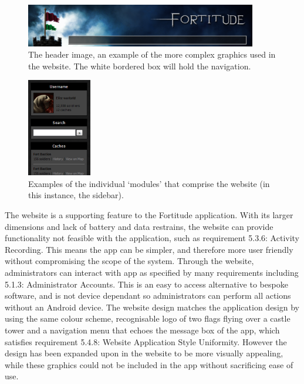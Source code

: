 \begin{figure}[ht]
	\vspace{-20pt}
	\begin{center}
	\includegraphics[width=0.9\textwidth]{images/website_header_background}
	\caption{The header image, an example of the more complex graphics used in the website. The white bordered box will hold the navigation.}
	\label{website_header_background}
	\end{center}
	\vspace{-20pt}
\end{figure}

\newpage
\begin{figure}
	\vspace{-15pt}
	\begin{center}
	\includegraphics[width=0.25\textwidth]{images/sidebar_modules}
	\caption{Examples of the individual `modules' that comprise the website (in this instance, the sidebar).}
	\label{sidebar_modules}
	\end{center}
	\vspace{20pt}
\end{figure}

The website is a supporting feature to the Fortitude application. With its larger dimensions and lack of battery and data restrains, the website can provide functionality not feasible with the application, such as requirement 5.3.6: Activity Recording. This means the app can be simpler, and therefore more user friendly without compromising the scope of the system.
Through the website, administrators can interact with app as specified by many requirements including 5.1.3: Administrator Accounts. This is an easy to access alternative to bespoke software, and is not device dependant so administrators can perform all actions without an Android device.
The website design matches the application design by using the same colour scheme, recognisable logo of two flags flying over a castle tower and a navigation menu that echoes the message box of the app, which satisfies requirement 5.4.8: Website Application Style Uniformity. However the design has been expanded upon in the website to be more visually appealing, while these graphics could not be included in the app without sacrificing ease of use.

